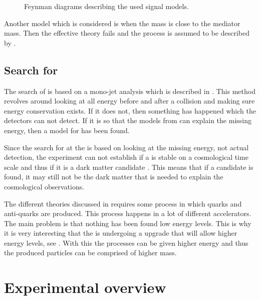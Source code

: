  \begin{figure}[H] %
    \hfill
    \caption{Feynman diagrams describing the used signal models.}
    \label{fig:opfeyn}
  \end{figure}
Another model which is considered is when the \abbrWIMP mass is close to the mediator mass. Then the effective theory fails and the process is assumed to be described by . 

\subsection{Search for \abbrWIMPS}\label{sec:tb:subsec:WIMPS}
The search of \abbrWIMPS is based on a mono-jet analysis which is described in . This method revolves around looking at all energy before and after a collision and making sure energy conservation exists. If it does not, then something has happened which the detectors can not detect. If it is so that the models from  can explain the missing energy, then a model for \abbrWIMPS has been found. 

Since the search for \abbrWIMPS at the \abbrLHC is based on looking at the missing energy, not actual detection, the experiment can not establish if a \abbrWIMP is stable on a cosmological time scale and thus if it is a dark matter candidate \citep{CERN-PH-EP-2012-210}. This means that if a candidate is found, it may still not be the dark matter that is needed to explain the cosmological observations.

The different theories discussed in  requires some process in which quarks and anti-quarks are produced. This process happens in a lot of different accelerators. The main problem is that nothing has been found low energy levels. This is why it is very interesting that the \abbrLHC is undergoing a upgrade that will allow higher energy levels, see . With this the processes can be given higher energy and thus the produced particles can be comprised of higher mass. 
\newpage
\section{Experimental overview}\label{sec:experiment}
